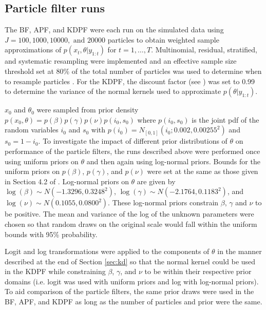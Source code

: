 \documentclass[useAMS,referee,usenatbib]{biom}
\begin{document}
\subsection{Particle filter runs \label{sec:pf}}

The BF, APF, and KDPF were each run on the simulated data using $J = 100, 1000, 10000, \mbox{ and } 20000$ particles to obtain weighted sample approximations of $p(x_t,\theta|y_{1:t})$ for $t = 1,\ldots,T$. Multinomial, residual, stratified, and systematic resampling were implemented and an effective sample size threshold set at 80\% of the total number of particles was used to determine when to resample particles \citep{Liu:Chen:Wong:reje:1998}. For the KDPF, the discount factor (see \citet{Liu:West:comb:2001}) was set to 0.99 to determine the variance of the normal kernels used to approximate $p(\theta|y_{1:t})$.

$x_0$ and $\theta_0$ were sampled from prior density $p(x_0,\theta) = p(\beta)p(\gamma)p(\nu)p(i_0,s_0)$ where $p(i_0,s_0)$ is the joint pdf of the random variables $i_0$ and $s_0$ with $p(i_0) = N_{[0,1]}(i_0;0.002,0.00255^2)$ and $s_0 = 1 - i_0$. %
To investigate the impact of different prior distributions of $\theta$ on performance of the particle filters, the runs described above were performed once using uniform priors on $\theta$ and then again using log-normal priors.  Bounds for the uniform priors on $p(\beta)$, $p(\gamma)$, and $p(\nu)$ were set at the same as those given in Section 4.2 of \citet{skvortsov2012monitoring}. %
Log-normal priors on $\theta$ are given by $\log(\beta) \sim  N(-1.3296, 0.3248^2)$, $\log(\gamma) \sim N(-2.1764, 0.1183^2)$, and $\log(\nu) \sim N(0.1055, 0.0800^2)$. These log-normal priors constrain $\beta$, $\gamma$ and $\nu$ to be positive.  The mean and variance of the log of the unknown parameters were chosen so that random draws on the original scale would fall within the uniform bounds with 95\% probability.

Logit and log transformations were applied to the components of $\theta$ in the manner described at the end of Section \ref{sec:kd} so that the normal kernel could be used in the KDPF while constraining $\beta$, $\gamma$, and $\nu$ to be within their respective prior domains (i.e. logit was used with uniform priors and log with log-normal priors).  To aid comparison of the particle filters, the same prior draws were used in the BF, APF, and KDPF as long as the number of particles and prior were the same.
\end{document}
